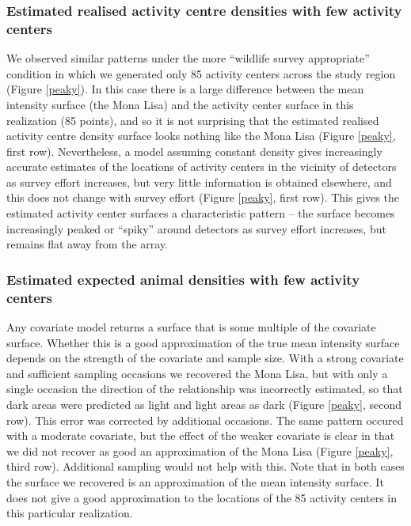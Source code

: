 \documentclass[10pt,a4paper]{article}
\begin{document}
\subsubsection{Estimated realised activity centre densities with few activity centers}

We observed similar patterns under the more ``wildlife survey appropriate'' condition in which we generated only 85 activity centers across the study region (Figure \ref{peaky}). In this case there is a large difference between the mean intensity surface (the Mona Lisa) and the activity center surface in this realization (85 points), and so it is not surprising that the estimated realised activity centre density surface looks nothing like the Mona Lisa (Figure \ref{peaky}, first row). Nevertheless, a model assuming constant density gives increasingly accurate estimates of the locations of activity centers in the vicinity of detectors as survey effort increases, but very little information is obtained elsewhere, and this does not change with survey effort (Figure \ref{peaky}, first row). This gives the estimated activity center surfaces a characteristic pattern -- the surface becomes increasingly peaked or ``spiky'' around detectors as survey effort increases, but remains flat away from the array. 

\subsubsection{Estimated expected animal densities with few activity centers}

Any covariate model returns a surface that is some multiple of the covariate surface. Whether this is a good approximation of the true mean intensity surface depends on the strength of the covariate and sample size. With a strong covariate and sufficient sampling occasions we recovered the Mona Lisa, but with only a single occasion the direction of the relationship was incorrectly estimated, so that dark areas were predicted as light and light areas as dark (Figure \ref{peaky}, second row). This error was corrected by additional occasions. The same pattern occured with a moderate covariate, but the effect of the weaker covariate is clear in that we did not recover as good an approximation of the Mona Lisa (Figure \ref{peaky}, third row). Additional sampling would not help with this. Note that in both cases the surface we recovered is an approximation of the mean intensity surface. It does not give a good approximation to the locations of the 85 activity centers in this particular realization.
\end{document}
